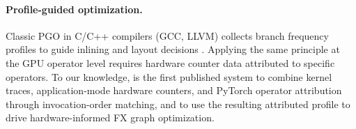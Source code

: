\paragraph{Profile-guided optimization.}
Classic PGO in C/C++ compilers (GCC, LLVM) collects branch frequency profiles to guide inlining
and layout decisions \cite{autofdo2016}. Applying the same principle at the GPU operator level requires hardware counter data attributed
to specific operators. To our knowledge, \sys is the first published system to combine
\nsys kernel traces, application-mode \ncu hardware counters, and PyTorch operator
attribution through invocation-order matching, and to use the resulting attributed profile
to drive hardware-informed FX graph optimization.
